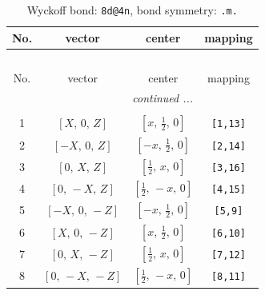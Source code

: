 \documentclass[fleqn,8pt]{jsarticle}
\begin{document}
\begin{longtable}{cccc}
\caption{Wyckoff bond: {\tt 8d@4n}, bond symmetry: {\tt .m.}}
 \\
 \hline \hline
No. & vector & center & mapping \\ \hline \endfirsthead

\multicolumn{3}{l}{\tablename\ \thetable{}} \\
 \hline \hline
No. & vector & center & mapping \\ \hline \endhead

 \hline \hline
\multicolumn{3}{r}{\footnotesize\it continued ...} \\ \endfoot

 \hline \hline
\multicolumn{3}{r}{} \\ \endlastfoot

1 & $\left[ X,\, 0,\, Z \right]$ & $\left[ x,\, \frac{1}{2},\, 0 \right]$ & {\tt [1,13]} \\ \hline
2 & $\left[ - X,\, 0,\, Z \right]$ & $\left[ - x,\, \frac{1}{2},\, 0 \right]$ & {\tt [2,14]} \\ \hline
3 & $\left[ 0,\, X,\, Z \right]$ & $\left[ \frac{1}{2},\, x,\, 0 \right]$ & {\tt [3,16]} \\ \hline
4 & $\left[ 0,\, - X,\, Z \right]$ & $\left[ \frac{1}{2},\, - x,\, 0 \right]$ & {\tt [4,15]} \\ \hline
5 & $\left[ - X,\, 0,\, - Z \right]$ & $\left[ - x,\, \frac{1}{2},\, 0 \right]$ & {\tt [5,9]} \\ \hline
6 & $\left[ X,\, 0,\, - Z \right]$ & $\left[ x,\, \frac{1}{2},\, 0 \right]$ & {\tt [6,10]} \\ \hline
7 & $\left[ 0,\, X,\, - Z \right]$ & $\left[ \frac{1}{2},\, x,\, 0 \right]$ & {\tt [7,12]} \\ \hline
8 & $\left[ 0,\, - X,\, - Z \right]$ & $\left[ \frac{1}{2},\, - x,\, 0 \right]$ & {\tt [8,11]} \\
\end{longtable}
\renewcommand{\arraystretch}{1.2}
\end{document}
